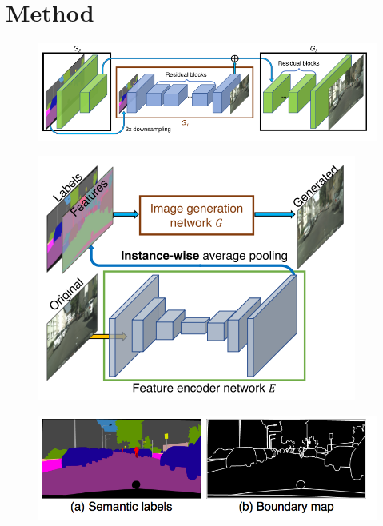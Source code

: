\documentclass{beamer}
\begin{document}
\section{Method}
\begin{frame}
	\begin{figure}
	\centering
	\includegraphics[height=0.45\textheight]{images/structure}
\end{figure}
\end{frame}

\begin{frame}
\begin{figure}
	\centering
	\includegraphics[height=0.45\textheight]{images/instance}
\end{figure}

\begin{figure}
	\centering
	\includegraphics[height=0.45\textheight]{images/instance_maps}
\end{figure}
\end{frame}
\end{document}
